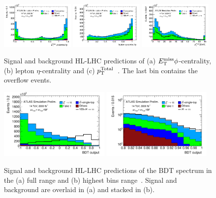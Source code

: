\begin{figure}[tp]
  \centering
  \includegraphics[width=0.32\textwidth]{figures/ATL-PHYS-PUB-2014-018/fig_05a}
  \includegraphics[width=0.32\textwidth]{figures/ATL-PHYS-PUB-2014-018/fig_05b}
  \includegraphics[width=0.32\textwidth]{figures/ATL-PHYS-PUB-2014-018/fig_05c}
  \caption{Signal and background HL-LHC predictions of (a) $E_{\mathrm{T}}^{\mathrm{miss}} \phi$-centrality, (b) $\text{lepton}$ $\eta$-centrality and (c) $p_{\mathrm{T}}^\text{Total}$~\cite{ATL-PHYS-PUB-2014-018}. The last bin contains the overflow events.}
  \label{fig:prospects-hllhc-other}
\end{figure}

\begin{figure}[tp]
  \centering
  \includegraphics[width=0.48\textwidth]{figures/ATL-PHYS-PUB-2014-018/fig_06a}
  \includegraphics[width=0.48\textwidth]{figures/ATL-PHYS-PUB-2014-018/fig_06b}
  \caption{Signal and background HL-LHC predictions of the BDT spectrum in the (a) full range and (b) highest bins range~\cite{ATL-PHYS-PUB-2014-018}. Signal and background are overlaid in (a) and stacked in (b).}
  \label{fig:prospects-hllhc-bdts}
\end{figure}

